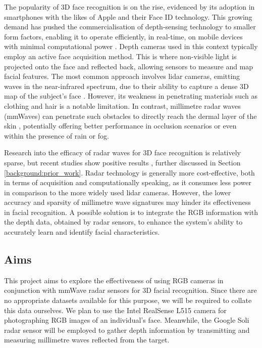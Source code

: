 \documentclass{interim}
\begin{document}
The popularity of 3D face recognition is on the rise, evidenced by its adoption in smartphones with the likes of Apple and their Face ID \cite{apple-faceid} technology. This growing demand has pushed the commercialisation of depth-sensing technology to smaller form factors, enabling it to operate efficiently, in real-time, on mobile devices with minimal computational power \cite{soumya2023recent}. Depth cameras used in this context typically employ an active face acquisition method. This is where non-visible light is projected onto the face and reflected back, allowing sensors to measure and map facial features. The most common approach involves lidar cameras, emitting waves in the near-infrared spectrum, due to their ability to capture a dense 3D map of the subject's face \cite{wang2020evolution}. However, its weakness in penetrating materials such as clothing and hair is a notable limitation. In contrast, millimetre radar waves (mmWaves) can penetrate such obstacles to directly reach the dermal layer of the skin \cite{vizard2006advances}, potentially offering better performance in occlusion scenarios or even within the presence of rain or fog.

Research into the efficacy of radar waves for 3D face recognition is relatively sparse, but recent studies show positive results \cite{hof2020face, lim2020dnn,kim2020face, pho2021radar,challa2021face}, further discussed in Section \ref{background:prior_work}. Radar technology is generally more cost-effective, both in terms of acquisition and computationally speaking, as it consumes less power in comparison to the more widely used lidar cameras. However, the lower accuracy and sparsity of millimetre wave signatures may hinder its effectiveness in facial recognition. A possible solution is to integrate the RGB information with the depth data, obtained by radar sensors, to enhance the system's ability to accurately learn and identify facial characteristics.


\subsection{Aims}
This project aims to explore the effectiveness of using RGB cameras in conjunction with mmWave radar sensors for 3D facial recognition. Since there are no appropriate datasets available for this purpose, we will be required to collate this data ourselves. We plan to use the Intel RealSense L515 camera \cite{intel-l515} for photographing RGB images of an individual's face. Meanwhile, the Google Soli radar sensor \cite{lien2016soli} will be employed to gather depth information by transmitting and measuring millimetre waves reflected from the target.
\end{document}
